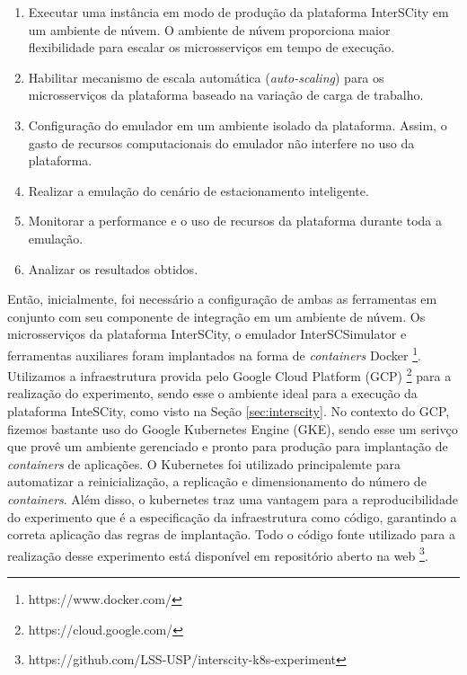 \begin{enumerate}
    \item Executar uma instância em modo de produção da plataforma InterSCity em um ambiente de núvem. O ambiente de núvem proporciona maior flexibilidade para escalar os microsserviços em tempo
        de execução.

    \item Habilitar mecanismo de escala automática (\textit{auto-scaling}) para os microsserviços da plataforma baseado na variação de carga de trabalho.

    \item Configuração do emulador em um ambiente isolado da plataforma. Assim, o gasto de recursos computacionais do emulador não interfere no uso da plataforma.

    \item Realizar a emulação do cenário de estacionamento inteligente.

    \item Monitorar a performance e o uso de recursos da plataforma durante toda a emulação.

    \item Analizar os resultados obtidos.
\end{enumerate}

Então, inicialmente, foi necessário a configuração de ambas as ferramentas em conjunto com seu componente de integração em um ambiente de núvem.
Os microsserviços da plataforma InterSCity, o emulador InterSCSimulator e ferramentas auxiliares foram implantados na forma de \textit{containers} Docker \footnote{https://www.docker.com/}.
Utilizamos a infraestrutura provida pelo Google Cloud Platform (GCP) \footnote{https://cloud.google.com/} para a realização do experimento, sendo esse o ambiente ideal para a execução da plataforma
InteSCity, como visto na Seção \ref{sec:interscity}.
No contexto do GCP, fizemos bastante uso do Google Kubernetes Engine (GKE), sendo esse um serivço que provê um ambiente gerenciado e pronto para produção para implantação de \textit{containers} de
aplicações.
O Kubernetes foi utilizado principalemte para automatizar a reinicialização, a replicação e dimensionamento do número de \textit{containers}.
Além disso, o kubernetes traz uma vantagem para a reproducibilidade do experimento que é a especificação da infraestrutura como código, garantindo a correta aplicação das regras de implantação.
Todo o código fonte utilizado para a realização desse experimento está disponível em repositório aberto na web \footnote{https://github.com/LSS-USP/interscity-k8s-experiment}.


